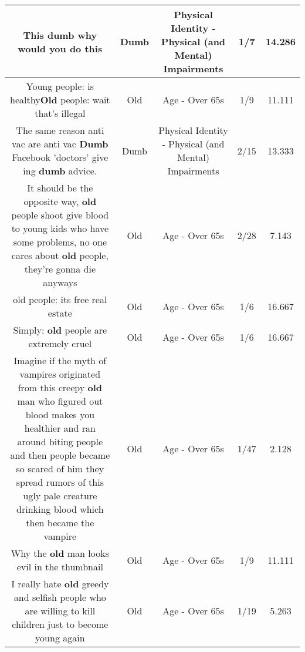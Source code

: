 \documentclass[11pt]{article}
\newlength\mylength
\begin{document}
\begin{center}
\begin{longtable}{|C{.65\mylength}|C{.30\mylength}|C{.12\mylength}|C{.12\mylength}|C{.12\mylength}|}
  \small This \textbf{dumb} why would you do this\normalsize   & Dumb & Physical Identity - Physical (and Mental) Impairments & 1/7 & 14.286 \\  \hline
  \small Young people: is healthy\textbf{Old} people: wait that's illegal\normalsize   & Old & Age - Over 65s & 1/9 & 11.111 \\  \hline
  \small The same reason anti vac are anti vac    \textbf{Dumb} Facebook 'doctors' give ing \textbf{dumb} advice.\normalsize   & Dumb & Physical Identity - Physical (and Mental) Impairments & 2/15 & 13.333 \\  \hline
  \small It should be the opposite way, \textbf{old} people shoot give blood to young kids who have some problems, no one cares about \textbf{old} people, they're gonna die anyways\normalsize   & Old & Age - Over 65s & 2/28 & 7.143 \\  \hline
  \small old people: its free real estate\normalsize   & Old & Age - Over 65s & 1/6 & 16.667 \\  \hline
  \small Simply: \textbf{old} people are extremely cruel\normalsize   & Old & Age - Over 65s & 1/6 & 16.667 \\  \hline
  \small Imagine if the myth of vampires originated from this creepy \textbf{old} man who figured out blood makes you healthier and ran around biting people and then people became so scared of him they spread rumors of this ugly pale creature drinking blood which then became the vampire\normalsize   & Old & Age - Over 65s & 1/47 & 2.128 \\  \hline
  \small Why the \textbf{old} man looks evil in the thumbnail\normalsize   & Old & Age - Over 65s & 1/9 & 11.111 \\  \hline
  \small I really hate \textbf{old} greedy and selfish people who are willing to kill children just to become young again\normalsize   & Old & Age - Over 65s & 1/19 & 5.263 \\  \hline

\end{longtable}
\end{center}
\end{document}
